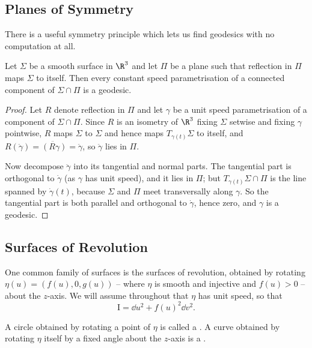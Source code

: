 \subsection{Planes of Symmetry}

There is a useful symmetry principle which lets us find geodesics with no computation at all.

\begin{proposition}
    Let $\Sigma$ be a smooth surface in $\R^3$ and let $\Pi$ be a plane such that reflection in $\Pi$ maps $\Sigma$ to itself. Then every constant speed parametrisation of a connected component of $\Sigma \cap \Pi$ is a geodesic.
\end{proposition}
\begin{proof}
    Let $R$ denote reflection in $\Pi$ and let $\gamma$ be a unit speed parametrisation of a component of $\Sigma\cap\Pi$. Since $R$ is an isometry of $\R^3$ fixing $\Sigma$ setwise and fixing $\gamma$ pointwise, $R$ maps $\Sigma$ to $\Sigma$ and hence maps $T_{\gamma(t)}\Sigma$ to itself, and $R(\ddot\gamma) = \ddot{(R\gamma)} = \ddot\gamma$, so $\ddot\gamma$ lies in $\Pi$.

    Now decompose $\ddot\gamma$ into its tangential and normal parts. The tangential part is orthogonal to $\dot\gamma$ (as $\gamma$ has unit speed), and it lies in $\Pi$; but $T_{\gamma(t)}\Sigma \cap \Pi$ is the line spanned by $\dot\gamma(t)$, because $\Sigma$ and $\Pi$ meet transversally along $\gamma$. So the tangential part is both parallel and orthogonal to $\dot\gamma$, hence zero, and $\gamma$ is a geodesic.
\end{proof}

\subsection{Surfaces of Revolution}

One common family of surfaces is the surfaces of revolution, obtained by rotating $\eta(u) = (f(u), 0, g(u))$ -- where $\eta$ is smooth and injective and $f(u) > 0$ -- about the $z$-axis. We will assume throughout that $\eta$ has unit speed, so that
$$
\mathrm{I} = \dd u^2 + f(u)^2 \dd v^2.
$$

\begin{definition}
A circle obtained by rotating a point of $\eta$ is called a . A curve obtained by rotating $\eta$ itself by a fixed angle about the $z$-axis is a .
\end{definition}


